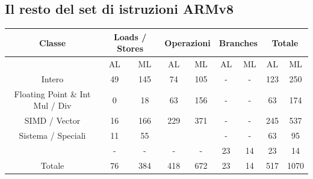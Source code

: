 \documentclass[12pt,a4paper]{article}
\begin{document}
\subsection{Il resto del set di istruzioni ARMv8}
\Sep
\begin{center}
\begin{tabular}{|c|cc|cc|cc|cc|}
\hline
\rowcolor[HTML]{FFCB2F} 
Classe                          & \multicolumn{2}{c|}{\cellcolor[HTML]{FFCB2F}Loads / Stores} & \multicolumn{2}{c|}{\cellcolor[HTML]{FFCB2F}Operazioni} & \multicolumn{2}{c|}{\cellcolor[HTML]{FFCB2F}Branches} & \multicolumn{2}{c|}{\cellcolor[HTML]{FFCB2F}Totale} \\ \hline
                                & \multicolumn{1}{c|}{AL}                & ML                 & \multicolumn{1}{c|}{AL}               & ML              & \multicolumn{1}{c|}{AL}              & ML             & \multicolumn{1}{c|}{AL}            & ML             \\ \hline
Intero                          & \multicolumn{1}{c|}{49}                & 145                & \multicolumn{1}{c|}{74}               & 105             & \multicolumn{1}{c|}{-}               & -              & \multicolumn{1}{c|}{123}           & 250            \\ \hline
Floating Point \& Int Mul / Div & \multicolumn{1}{c|}{0}                 & 18                 & \multicolumn{1}{c|}{63}               & 156             & \multicolumn{1}{c|}{-}               & -              & \multicolumn{1}{c|}{63}            & 174            \\ \hline
SIMD / Vector                   & \multicolumn{1}{c|}{16}                & 166                & \multicolumn{1}{c|}{229}              & 371             & \multicolumn{1}{c|}{-}               & -              & \multicolumn{1}{c|}{245}           & 537            \\ \hline
Sistema / Speciali              & \multicolumn{1}{c|}{11}                & 55                 & \multicolumn{1}{c|}{}                 &                 & \multicolumn{1}{c|}{-}               & -              & \multicolumn{1}{c|}{63}            & 95             \\ \hline
                                & \multicolumn{1}{c|}{-}                 & -                  & \multicolumn{1}{c|}{-}                & -               & \multicolumn{1}{c|}{23}              & 14             & \multicolumn{1}{c|}{23}            & 14             \\ \hline
Totale                          & \multicolumn{1}{c|}{76}                & 384                & \multicolumn{1}{c|}{418}              & 672             & \multicolumn{1}{c|}{23}              & 14             & \multicolumn{1}{c|}{517}           & 1070           \\ \hline
\end{tabular}
\end{center}
\end{document}
